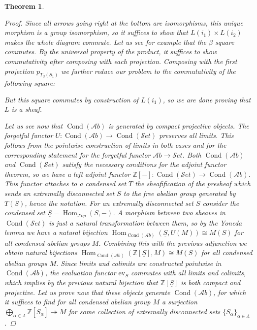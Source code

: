 \documentclass[11pt,A4]{article}
\theoremstyle{plain}
\newtheorem{thm}{Theorem}[section]
\theoremstyle{definition}
\theoremstyle{remark}
\newcommand{\Z}{\mathbb{Z}}
\newcommand{\1}{\mathbbm{1}}
\newcommand{\Top}{\mathscr{T}op}
\newcommand{\Ab}{\mathscr{A}b}
\newcommand{\Set}{\mathscr{S}et}
\DeclareMathOperator{\Hom}{Hom}
\DeclareMathOperator{\Cond}{Cond}
\renewcommand{\u}[1]{\underline{#1}}
\newcommand{\ev}{\mathrm{ev}}
\begin{document}
\begin{thm}
\begin{proof}
	Since all arrows going right at the bottom are isomorphisms, this unique morphism is a group isomorphism, so it suffices to show that $L(i_{1})\times L(i_{2})$ makes the whole diagram commute.
	Let us see for example that the $\beta$ square commutes.
	By the universal property of the product, it suffices to show commutativity after composing with each projection.
	Composing with the first projection $p_{T_{\beta}(S_{1})}$ we further reduce our problem to the commutativity of the following square:
	\begin{center}
	\end{center}
	But this square commutes by construction of $L(i_{1})$, so we are done proving that $L$ is a sheaf.

	Let us see now that $\Cond(\Ab)$ is generated by compact projective objects.
	The forgetful functor $U\colon \Cond(\Ab)\to \Cond(\Set)$ preserves all limits.
	This follows from the pointwise construction of limits in both cases and for the corresponding statement for the forgetful functor $\Ab\to \Set$.
	Both $\Cond(\Ab)$ and $\Cond(\Set)$ satisfy the necessary conditions for the adjoint functor theorem, so we have a left adjoint functor $\Z[-]\colon\Cond(\Set)\to \Cond(\Ab)$.
	This functor attaches to a condensed set $T$ the sheafification of the presheaf which sends an extremally disconnected set $S$ to the free abelian group generated by $T(S)$, hence the notation.
	For an extremally disconnected set $S$ consider the condensed set $\u{S}=\Hom_{\Top}(S,-)$.
	A morphism between two sheaves in $\Cond(\Set)$ is just a natural transformation between them, so by the Yoneda lemma we have a natural bijection $\Hom_{\Cond(\Ab)}(\u{S},U(M))\cong M(S)$ for all condensed abelian groups $M$.
	Combining this with the previous adjunction we obtain natural bijections $\Hom_{\Cond(\Ab)}(\Z[\u{S}],M)\cong M(S)$ for all condensed abelian groups $M$.
	Since limits and colimits are constructed pointwise in $\Cond(\Ab)$, the evaluation functor $\ev_{S}$ commutes with all limits and colimits, which implies by the previous natural bijection that $\Z[\u{S}]$ is both compact and projective.
	Let us prove now that these objects generate $\Cond(\Ab)$, for which it suffices to find for all condensed abelian group $M$ a surjection $\bigoplus_{\alpha \in \Lambda}\Z[\u{S_{\alpha}}]\twoheadrightarrow M$ for some collection of extremally disconnected sets $\{S_{\alpha}\}_{\alpha\in \Lambda}$.
	

\end{proof}
\end{thm}
\end{document}
